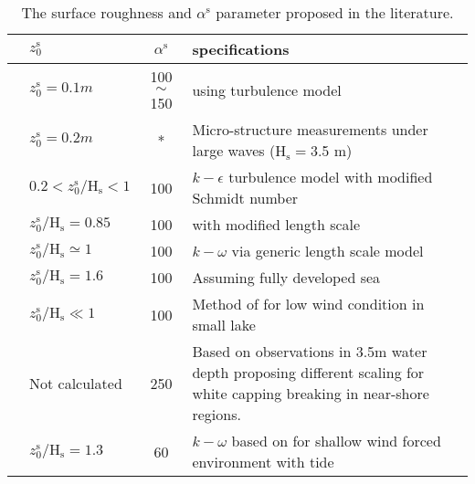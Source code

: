 \documentclass[final]{svjour3}
\begin{document}
\begin{table}
 \begin{center}
   \caption{The surface roughness and $\alpha^\mathrm{s}$ parameter proposed in
   the literature.}
   \label{tab:surface_roughness_alpha_litrature}
     \begin{tabular}{l p{3cm} c p{5cm} }
      \hline
                                    &  ${z_0^\mathrm{s}}$    &  $\alpha^\mathrm{s}$ & specifications\\ \hline 
      
      \cite{craig1994modeling}      &  ${z_0^\mathrm{s}}=0.1 m $            & 100 $\sim$ 150 & using \cite{MellorYamada82} turbulence model
\\
      \cite{GemmrichFarmer99}       &  ${z_0^\mathrm{s}}=0.2 m $            & * & 
      Micro-structure measurements under large waves ($\mathrm{H}_\mathrm{s}=$3.5 m)  
      \\
      \cite{burchard2001simulating} &  $0.2 <  {z_0^\mathrm{s}} / {\mathrm{H}_\mathrm{s}} <1$  & 100 & 
      $k-\epsilon$ turbulence model with  modified Schmidt number   \\
      \cite{Terrayetal99}           &  ${z_0^\mathrm{s}} / {\mathrm{H}_\mathrm{s}}  =0.85$     & 100& 
      \cite{craig1994modeling} with modified length scale
\\
      \cite{Umlauf03a}              &  ${z_0^\mathrm{s}} / {\mathrm{H}_\mathrm{s}}  \simeq 1$   &100 & 
      $k-\omega$ via generic length scale model
   \\
      \cite{kantha2004effect}       &  ${z_0^\mathrm{s}} / {\mathrm{H}_\mathrm{s}} = 1.6 $      &100 &
      Assuming fully developed sea
      
\\
      \cite{stips2005m}             &  ${z_0^\mathrm{s}} / {\mathrm{H}_\mathrm{s}}  \ll  1$    &100&  
      Method of \cite{Umlauf03a} for low wind condition in small lake
\\
      \cite{feddersen2007vertical}     &  Not calculated   & 250 &  
     Based on observations in 3.5m water depth proposing different scaling for
     white capping breaking in near-shore regions.
     \\
      \cite{jones2008influence}     &  ${z_0^\mathrm{s}} / {\mathrm{H}_\mathrm{s}} = 1.3 $     & 60 &  
      $k-\omega$  based on \cite{Umlauf03a} for shallow wind forced environment
      with tide   \\      
      

\end{tabular}
\end{center}
\end{table}
\end{document}
